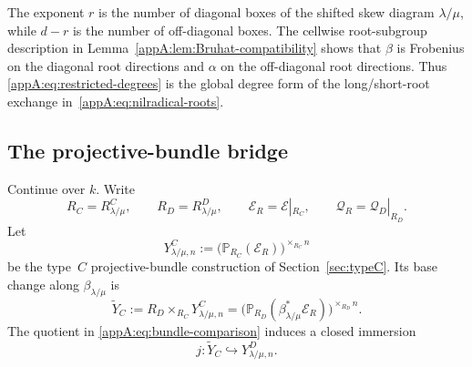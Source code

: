 \documentclass[11pt,a4paper,oneside]{amsart}
\numberwithin{equation}{section}
\theoremstyle{definition}
\theoremstyle{remark}
\begin{document}
The exponent $r$ is the number of diagonal boxes of the shifted skew diagram
$\lambda/\mu$, while $d-r$ is the number of off-diagonal boxes.  The
cellwise root-subgroup description in
Lemma~\ref{appA:lem:Bruhat-compatibility} shows that $\beta$ is Frobenius
on the diagonal root directions and $\alpha$ on the off-diagonal root
directions.  Thus
\eqref{appA:eq:restricted-degrees} is the global degree form of the
long/short-root exchange in~\eqref{appA:eq:nilradical-roots}.

\subsection{The projective-bundle bridge}
\label{appA:projective-bundle-bridge}

Continue over $k$.  Write
\[
  R_C=R^C_{\lambda/\mu},
  \qquad
  R_D=R^D_{\lambda/\mu},
  \qquad
  \mathcal E_R=\mathcal E|_{R_C},
  \qquad
  \mathcal Q_R=\mathcal Q_D|_{R_D}.
\]
Let
\[
  Y^C_{\lambda/\mu,n}
  :=\bigl(\mathbb P_{R_C}(\mathcal E_R)\bigr)^{\times_{R_C}n}
\]
be the type~$C$ projective-bundle construction of Section~\ref{sec:typeC}.  Its base
change along $\beta_{\lambda/\mu}$ is
\begin{equation}
\label{appA:eq:base-changed-C-model}
  \widetilde Y_C
  :=R_D\times_{R_C}Y^C_{\lambda/\mu,n}
  =\bigl(\mathbb P_{R_D}(\beta_{\lambda/\mu}^*\mathcal E_R)
    \bigr)^{\times_{R_D}n}.
\end{equation}
The quotient in \eqref{appA:eq:bundle-comparison} induces a closed immersion
\begin{equation}
\label{appA:eq:bridge-immersion}
  j:\widetilde Y_C\hookrightarrow Y^D_{\lambda/\mu,n}.
\end{equation}
\end{document}

